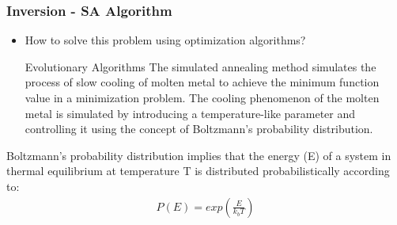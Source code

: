\documentclass{beamer}
\begin{document}
\begin{frame}
\frametitle{Inversion - SA Algorithm}

\begin{itemize}
\item How to solve this problem using optimization algorithms?
\begin{block}{Evolutionary Algorithms}
The simulated annealing method simulates the process of slow cooling of molten
metal to achieve the minimum function value in a minimization problem. The cooling
phenomenon of the molten metal is simulated by introducing a temperature-like parameter
and controlling it using the concept of Boltzmann’s probability distribution.
\end{block}
\end{itemize}
Boltzmann’s probability distribution implies that the energy (E) of a system in thermal
equilibrium at temperature T is distributed probabilistically according to:
\begin{eqnarray}
P(E)=exp(\frac{E} {k_b T})
\end{eqnarray}
\end{frame}
\end{document}
